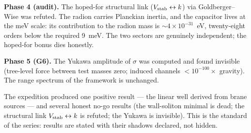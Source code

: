\textbf{Phase 4 (audit).} The hoped-for structural link ($V_{\rm stab}\leftrightarrow k$) via Goldberger--Wise was refuted. The radion carries Planckian inertia, and the capacitor lives at the meV scale: its contribution to the radion mass is $\sim4\times10^{-31}$~eV, twenty-eight orders below the required 9~meV. The two sectors are genuinely independent; the hoped-for bonus dies honestly.

\textbf{Phase 5 (G6).} The Yukawa amplitude of $\sigma$ was computed and found invisible (tree-level force between test masses zero; induced channels $<10^{-100}\times$ gravity). The range spectrum of the framework is unchanged.

The expedition produced one positive result --- the linear well derived from brane sources --- and several honest no-go results (the wall-soliton minimal is dead; the structural link $V_{\rm stab}\leftrightarrow k$ is refuted; the Yukawa is invisible). This is the standard of the series: results are stated with their shadows declared, not hidden.

